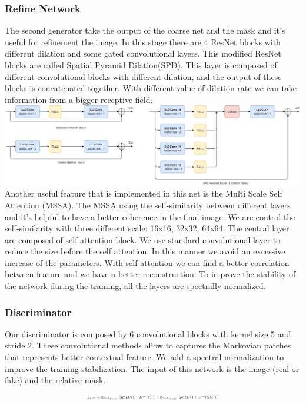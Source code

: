 \documentclass[10pt,twocolumn,letterpaper]{article}
\begin{document}
\subsubsection{Refine Network}
The second generator take the output of the coarse net and the mask and it's useful for refinement the image.
In this stage there are 4 ResNet blocks with different dilation and some gated convolutional layers.
This modified ResNet blocks are called Spatial Pyramid Dilation(SPD). This layer is composed of different convolutional blocks with different dilation, and the output of these blocks is concatenated together. With different value of dilation rate we can take information from a bigger receptive field.
\includegraphics[width=1\linewidth]{img/ResNetSPD.png}
Another useful feature that is implemented in this net is the Multi Scale Self Attention (MSSA). The MSSA using the self-similarity between different layers and it's helpful to have a better coherence in the final image. We are control the self-similarity with three different scale: 16x16, 32x32, 64x64.
The central layer are composed of self attention block. We use standard convolutional layer to reduce the size before the self attention. In this manner we avoid an excessive increase of the parameters. With self attention we can find a better correlation between feature and we have a better reconstruction. To improve the stability of the network during the training, all the layers are spectrally normalized.
\subsubsection{Discriminator}
Our discriminator is composed by 6 convolutional blocks with kernel size 5 and stride 2.
These convolutional methods allow to captures the Markovian patches that represents better contextual feature\cite{li2016precomputed}.
We add a spectral normalization to improve the training stabilization\cite{miyato2018spectral}.
The input of this network is the image (real or fake) and the relative mask. 
\begin{equation}
    \resizebox{.47 \textwidth}{!}{%
        $\mathcal{L}_{D^{sn}}= \mathbb{E}_{x\sim \mathbb{P}_{data(x)}} \left [ ReLU(1-D^{sn}(x))) \right ] + \mathbb{E}_{z\sim \mathbb{P}_{data(x)}} \left [ ReLU(1+D^{sn}(G(z)))\right ]$%
}
\end{equation}
\end{document}
